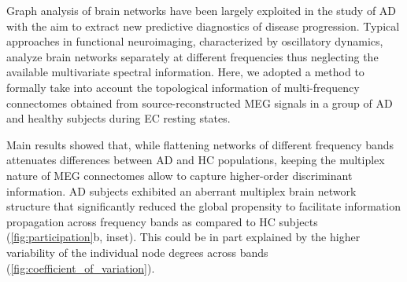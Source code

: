 

Graph analysis of brain networks have been largely exploited in the study of AD with the aim to extract new predictive diagnostics of disease progression.
Typical approaches in functional neuroimaging, characterized by oscillatory dynamics, analyze brain networks separately at different frequencies thus neglecting the available multivariate spectral information.
Here, we adopted a method to formally take into account the topological information of multi-frequency connectomes obtained from source-reconstructed MEG signals in a group of AD and healthy subjects during EC resting states.


Main results showed that, while flattening networks of different frequency bands attenuates differences between AD and HC populations, keeping the multiplex nature of MEG connectomes allow to capture higher-order discriminant information.
AD subjects exhibited an aberrant multiplex brain network structure that significantly reduced the global propensity to facilitate information propagation across frequency bands as compared to HC subjects (\autoref{fig:participation}b, inset). This could be in part explained by the higher variability of the individual node degrees across bands (\autoref{fig:coefficient_of_variation}).




